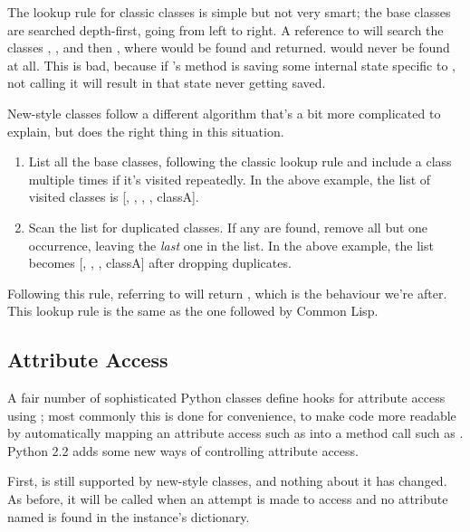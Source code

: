 \documentclass{howto}
\begin{document}
The lookup rule for classic classes is simple but not very smart; the
base classes are searched depth-first, going from left to right.  A
reference to  will search the classes ,
, and then , where  would be found
and returned.   would never be found at all.  This is
bad, because if 's  method is saving some
internal state specific to , not calling it will result in
that state never getting saved.

New-style classes follow a different algorithm that's a bit more
complicated to explain, but does the right thing in this situation.

\begin{enumerate}

\item List all the base classes, following the classic lookup rule and
include a class multiple times if it's visited repeatedly.  In the
above example, the list of visited classes is [, ,
, , class{A}].

\item Scan the list for duplicated classes.  If any are found, remove
all but one occurrence, leaving the \emph{last} one in the list.  In
the above example, the list becomes [, , ,
class{A}] after dropping duplicates.

\end{enumerate}

Following this rule, referring to  will return
, which is the behaviour we're after.  This lookup
rule is the same as the one followed by Common Lisp.  


\subsection{Attribute Access}

A fair number of sophisticated Python classes define hooks for
attribute access using ; most commonly this is
done for convenience, to make code more readable by automatically
mapping an attribute access such as  into a method
call such as .  Python 2.2 adds some new ways
of controlling attribute access.

First,  is still supported by
new-style classes, and nothing about it has changed.  As before, it
will be called when an attempt is made to access  and no
attribute named  is found in the instance's dictionary.
\end{document}
